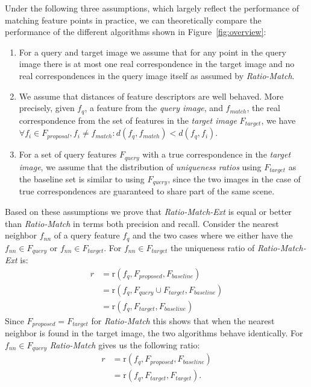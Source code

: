 \documentclass[10pt,journal,cspaper,compsoc]{IEEEtran}
\begin{document}
Under the following three assumptions, which largely reflect the performance of 
matching feature points in practice, we can theoretically compare the 
performance of the different algorithms shown in 
Figure~\ref{fig:overview}:
\begin{enumerate}
    \item{For a query and target image we assume that for any point in 
        the query image there is at most one real correspondence in the 
    target image and no real correspondences in the query image itself 
as assumed by \emph{Ratio-Match}.}
    \item{We assume that distances of feature descriptors are well 
            behaved.  More precisely, given $f_q$, a feature from the 
            \emph{query image}, and $f_{match}$, the real correspondence 
            from the set of features in the \emph{target image} 
            $F_{target}$, we have $\forall f_i \in F_{proposal}, 
            f_i \neq f_{match}: d(f_q,f_{match}) < d(f_q, f_i)$.}
     \item{For a set of query features $F_{query}$ with a true 
             correspondence in the \emph{target image}, we assume that 
             the distribution of \emph{uniqueness ratios} using $F_{target}$ as 
             the baseline set is similar to using $F_{query}$, since the 
         two images in the case of true correspondences are guaranteed 
     to share part of the same scene.}
    \end{enumerate}

Based on these assumptions we prove that \emph{Ratio-Match-Ext} is equal 
or better than \emph{Ratio-Match} in terms both precision and recall.  
Consider the nearest neighbor $f_{nn}$ of a query feature $f_{q}$ and 
the two cases where we either have the $f_{nn} \in F_{query}$ or $f_{nn} 
\in F_{target}$. For $f_{nn} \in F_{target}$ the uniqueness ratio of 
\emph{Ratio-Match-Ext} is:
\begin{align*}
    r &= \text{r}(f_{q}, F_{proposed}, F_{baseline}) \\
        &= \text{r}(f_{q}, F_{query} \cup F_{target}, F_{baseline})\\
        &= \text{r}(f_{q}, F_{target}, F_{baseline})
\end{align*}
Since $F_{proposed} = F_{target}$ for \emph{Ratio-Match} this shows that
when the nearest neighbor is found in the target image, the two 
algorithms behave identically. For $f_{nn} \in F_{query}$ 
\emph{Ratio-Match} gives us the following ratio:
\begin{align*}
    r &= \text{r}(f_{q}, F_{proposed}, F_{baseline}) \\
        &= \text{r}(f_{q}, F_{target}, F_{target}).
\end{align*}
\end{document}
